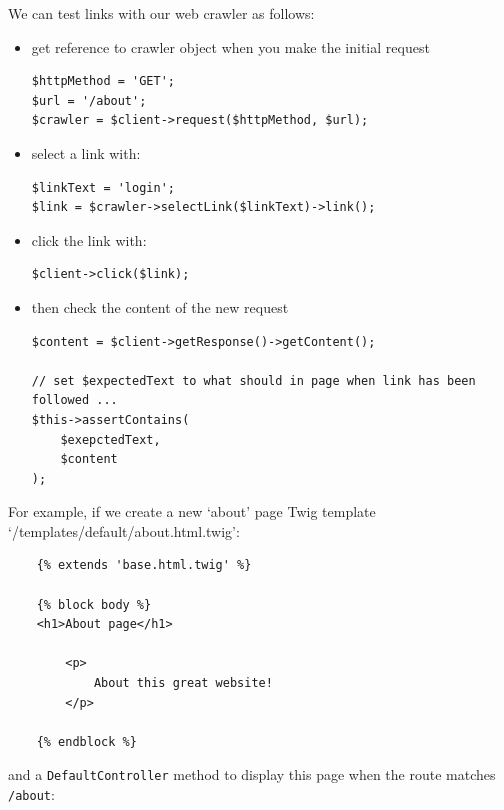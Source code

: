 \documentclass[a4paperpaper,openright]{book}
\newenvironment{Shaded}{}{}
\newcommand{\AnnotationTok}[1]{\textcolor[rgb]{0.38,0.63,0.69}{\textbf{\textit{#1}}}}
\newcommand{\CommentTok}[1]{\textcolor[rgb]{0.38,0.63,0.69}{\textit{#1}}}
\newcommand{\KeywordTok}[1]{\textcolor[rgb]{0.00,0.44,0.13}{\textbf{#1}}}
\newcommand{\NormalTok}[1]{#1}
\newcommand{\OtherTok}[1]{\textcolor[rgb]{0.00,0.44,0.13}{#1}}
\newcommand{\StringTok}[1]{\textcolor[rgb]{0.25,0.44,0.63}{#1}}
\begin{document}
We can test links with our web crawler as follows:

\begin{itemize}
\item
  get reference to crawler object when you make the initial request

\begin{verbatim}
$httpMethod = 'GET';
$url = '/about';
$crawler = $client->request($httpMethod, $url);
\end{verbatim}
\item
  select a link with:

\begin{verbatim}
$linkText = 'login';
$link = $crawler->selectLink($linkText)->link();
\end{verbatim}
\item
  click the link with:

\begin{verbatim}
$client->click($link);
\end{verbatim}
\item
  then check the content of the new request

\begin{verbatim}
$content = $client->getResponse()->getContent();

// set $expectedText to what should in page when link has been followed ...
$this->assertContains(
    $exepctedText,
    $content
);
\end{verbatim}
\end{itemize}

For example, if we create a new `about' page Twig template
`/templates/default/about.html.twig':

\begin{verbatim}
    {% extends 'base.html.twig' %}

    {% block body %}
    <h1>About page</h1>

        <p>
            About this great website!
        </p>

    {% endblock %}
\end{verbatim}

and a \texttt{DefaultController} method to display this page when the
route matches \texttt{/about}:

\begin{Shaded}
\end{Shaded}
\end{document}
